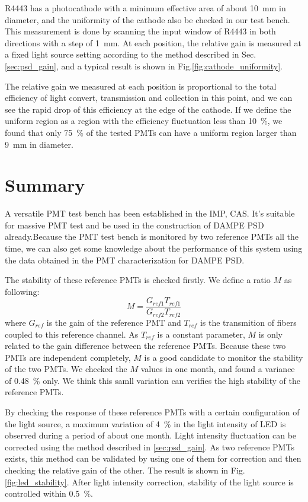 \documentclass[5p, times]{elsarticle}
\begin{document}
R4443 has a photocathode with a minimum effective area of about \SI{10}{\milli\meter} in diameter, and the uniformity of the cathode also be checked in our test bench.
This measurement is done by scanning the input window of R4443 in both directions with a step of \SI{1}{\milli\meter}.
At each position, the relative gain is measured at a fixed light source setting according to the method described in Sec.\ref{sec:psd_gain}, and a typical result is shown in Fig.\ref{fig:cathode_uniformity}.

The relative gain we measured at each position is proportional to the total efficiency of light convert, transmission and collection in this point, and we can see the rapid drop of this efficiency at the edge of the cathode. If we define the uniform region as a region with the efficiency fluctuation less than \SI{10}{\percent}, we found that only \SI{75}{\percent} of the tested PMTs can have a uniform region larger than \SI{9}{\milli\meter} in diameter. 

\section{Summary}
\label{sec:summary}

A versatile PMT test bench has been established in the IMP, CAS. It's suitable for massive PMT test and be used in the construction of DAMPE PSD already.Because the PMT test bench is monitored by two reference PMTs all the time, we can also get some knowledge about the performance of this system using the data obtained in the PMT characterization for DAMPE PSD.

The stability of these reference PMTs is checked firstly. We define a ratio $M$ as following:
\begin{equation}
 M = \frac{G_{ref1} T_{ref1}}{G_{ref2} T_{ref2}}
\end{equation}
where $G_{ref}$ is the gain of the reference PMT and $T_{ref}$ is the transmition of fibers coupled to this reference channel.
As $T_{ref}$ is a constant parameter, $M$ is only related to the gain difference between the reference PMTs.
Because these two PMTs are independent completely, $M$ is a good candidate to monitor the stability of the two PMTs. We checked the $M$ values in one month, and found a variance of \SI{0.48}{\percent} only. We think this samll variation can verifies the high stability of the reference PMTs.

By checking the response of these reference PMTs with a certain configuration of the light source, a maximum variation of \SI{4}{\percent} in the light intensity of LED is observed during a period of about one month.
Light intensity fluctuation can be corrected using the method described in \ref{sec:psd_gain}.
As two reference PMTs exists, this method can be validated by using one of them for correction and then checking the relative gain of the other. 
The result is shown in Fig.\ref{fig:led_stability}.
After light intensity correction, stability of the light source is controlled within \textpm\SI{0.5}{\percent}.
\end{document}

